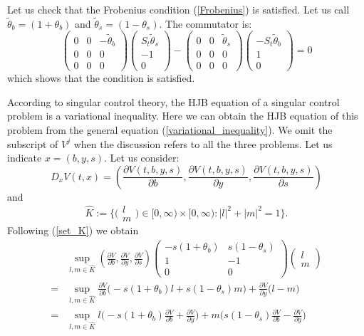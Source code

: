 Let us check that the Frobenius condition (\ref{Frobenius}) is satisfied.
Let us call $\tilde \theta_b = (1+\theta_b)$ and $\tilde \theta_s = (1-\theta_s)$.  The commutator is:
\begin{equation}
 \left( \begin{array}{ccc}
0 & 0 & -\tilde \theta_b \\
0 & 0 & 0 \\
0 & 0 & 0
\end{array} \right)
\left( \begin{array}{l}
 S_{t}\tilde \theta_s \\
-1 \\
0
\end{array} \right) -
 \left( \begin{array}{ccc}
0 & 0 & \tilde \theta_s \\
0 & 0 & 0 \\
0 & 0 & 0
\end{array} \right)
\left( \begin{array}{l}
-S_{t}\tilde \theta_b \\
1 \\
0
\end{array} \right) = 0
\end{equation}
which shows that the condition is satisfied.

According to singular control theory, the HJB equation of a singular control problem is a variational inequality. Here we can obtain the HJB equation of this problem 
from the general equation (\ref{variational_inequality}). We omit the subscript of $V^j$ when the discussion refers to all the three problems. 
Let us indicate $x = (b,y,s)$. Let us consider:
$$ D_x V(t,x) = \left( \frac{\partial V(t,b,y,s)}{\partial b}, \frac{\partial V(t,b,y,s)}{\partial y}, \frac{\partial V(t,b,y,s)}{\partial s} \right) $$
and
$$ \hat K := \biggl \{ \biggl( \begin{array}{c} l \\ m \end{array} \biggr) \in [0,\infty) \times [0,\infty): |l|^2 + |m|^2 = 1 \biggr \}. $$ 
Following (\ref{set_K}) we obtain
\begin{align*}
& \sup_{l,m \in \hat K}
\left( \frac{\partial V}{\partial b}, \frac{\partial V}{\partial y}, \frac{\partial V}{\partial s} \right)
\left( \begin{array}{cc}
-s(1+\theta_b) & s(1-\theta_s) \\
1 & -1 \\
0 & 0
\end{array} \right)
\left( \begin{array}{c}
l \\
m 
\end{array} \right) \\ 
= & \sup_{l,m \in \hat K}
\frac{\partial V}{\partial b} \biggl( -s(1+\theta_b)l + s(1-\theta_s)m \biggr) +
\frac{\partial V}{\partial y} \bigl( l-m \bigr) \\
= & \sup_{l,m \in \hat K}
l \biggl( -s(1+\theta_b)\frac{\partial V}{\partial b} + \frac{\partial V}{\partial y} \biggr) +
m \biggl( s(1-\theta_s)\frac{\partial V}{\partial b} - \frac{\partial V}{\partial y} \biggr)
\end{align*}

